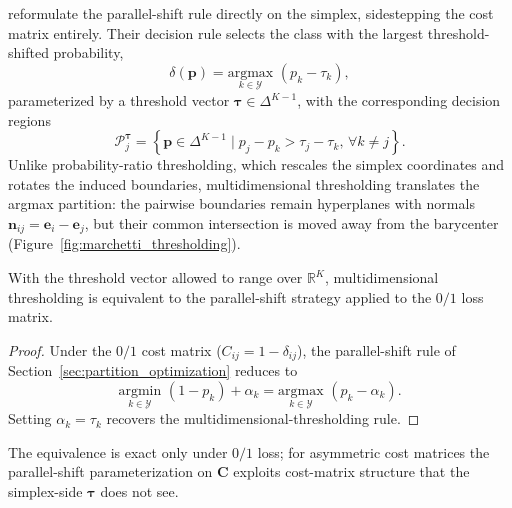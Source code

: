 \citet{legnaro2025multiclass} reformulate the parallel-shift rule directly on the simplex, sidestepping the cost matrix entirely. Their decision rule selects the class with the largest threshold-shifted probability,
\begin{equation}
    \delta(\mathbf{p}) = \underset{k \in \mathcal{Y}}{\mathrm{argmax}} \,\, (p_k - \tau_k),
\end{equation}
parameterized by a threshold vector $\boldsymbol{\tau} \in \Delta^{K-1}$, with the corresponding decision regions
\begin{equation}
    \mathcal{P}_j^{\boldsymbol{\tau}} = \left\{ \mathbf{p} \in \Delta^{K-1} \mid p_j - p_k > \tau_j - \tau_k, \, \forall k \neq j \right\}.
\end{equation}
Unlike probability-ratio thresholding, which rescales the simplex coordinates and rotates the induced boundaries, multidimensional thresholding translates the argmax partition: the pairwise boundaries remain hyperplanes with normals $\mathbf{n}_{ij} = \mathbf{e}_i - \mathbf{e}_j$, but their common intersection is moved away from the barycenter (Figure~\ref{fig:marchetti_thresholding}).

\begin{proposition}\label{prop:marchetti_equivalence}
    With the threshold vector allowed to range over $\mathbb{R}^K$, multidimensional thresholding is equivalent to the parallel-shift strategy applied to the $0/1$ loss matrix.
\end{proposition}

\begin{proof}
    Under the $0/1$ cost matrix ($C_{ij} = 1 - \delta_{ij}$), the parallel-shift rule of Section~\ref{sec:partition_optimization} reduces to
    \begin{equation}
        \underset{k \in \mathcal{Y}}{\mathrm{argmin}} \,\, (1 - p_k) + \alpha_k = \underset{k \in \mathcal{Y}}{\mathrm{argmax}} \,\, (p_k - \alpha_k).
    \end{equation}
    Setting $\alpha_k = \tau_k$ recovers the multidimensional-thresholding rule.
\end{proof}

The equivalence is exact only under $0/1$ loss; for asymmetric cost matrices the parallel-shift parameterization on $\mathbf{C}$ exploits cost-matrix structure that the simplex-side $\boldsymbol{\tau}$ does not see.

